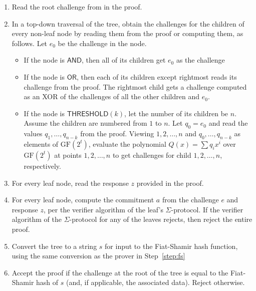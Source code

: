 \documentclass[11pt]{article}
\newcommand{\andnode}{\ensuremath{\mathsf{AND}}}
\newcommand{\ornode}{\ensuremath{\mathsf{OR}}}
\newcommand{\tnode}{\ensuremath{\mathsf{THRESHOLD}}}
\newcommand{\GF}{\ensuremath{\mathrm{GF}}}
\begin{document}
\begin{enumerate}
\item Read the root challenge from in the proof.

\item In a top-down traversal of the tree, obtain the challenges for the children of every non-leaf node by reading them from the proof or computing them, as follows. Let $e_0$ be the challenge in the node.
        \begin{itemize}
            \item If the node is $\andnode$,  then all of its children get $e_0$ as the challenge
            \item If the node is $\ornode$, then each of its children except rightmost reads its challenge from the proof. The rightmost child gets a challenge computed as an XOR of the challenges of all the other children and $e_0$.
            \item If the node is $\tnode(k)$, let the number of its children be $n$. Assume the children are numbered from $1$ to $n$. Let $q_0=e_0$ and read the values $q_1, \dots, q_{n-k}$ from the proof. Viewing $1, 2, \dots, n$ and $q_0, \dots, q_{n-k}$ as elements of $\GF(2^t)$, evaluate the polynomial $Q(x) = \sum {q_i x^i}$ over $\GF(2^t)$ at points $1, 2, \dots, n$ to get challenges for child $1, 2, \dots, n$, respectively.
        \end{itemize}

 \item For every leaf node, read the response $z$ provided in the proof.

\item For every leaf node, compute the commitment $a$ from the challenge $e$ and response $z$, per the verifier algorithm of the leaf's $\Sigma$-protocol. If the verifier algorithm of the $\Sigma$-protocol for any of the leaves rejects, then reject the entire proof.

\item Convert the tree to a string $s$ for input to the Fiat-Shamir hash function, using the same conversion as the prover in Step~\ref{step:fs}

\item Accept the proof if the challenge at the root of the tree is equal to the Fiat-Shamir hash of $s$ (and, if applicable,  the associated data). Reject otherwise.
\end{enumerate}
\end{document}
